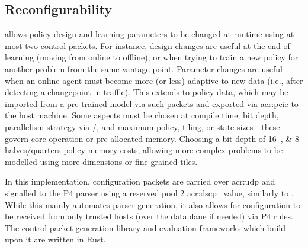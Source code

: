 

\subsection{Reconfigurability}\label{sec:reconfigurability}
\approachshort{} allows policy design and learning parameters to be changed at runtime using at most two control packets.
For instance, design changes are useful at the end of learning (moving from online to offline), or when trying to train a new policy for another problem from the same vantage point.
Parameter changes are useful when an online agent must become more (or less) adaptive to new data (i.e., after detecting a changepoint in traffic).
This extends to policy data, which may be imported from a pre-trained model via such packets and exported via \gls{acr:pcie} to the host machine.
Some aspects must be chosen at compile time; bit depth, parallelism strategy via \Coopfw/\Indfw, and maximum policy, tiling, or state sizes---these govern core operation or pre-allocated memory.
Choosing a bit depth of \qtylist[list-pair-separator = { or }]{16;8}{\bit} halves/quarters policy memory costs, allowing more complex problems to be modelled using more dimensions or fine-grained tiles.

In this implementation, configuration packets are carried over \gls{acr:udp} and signalled to the P4 parser using a reserved pool 2 \gls{acr:dscp}~\parencite{rfc2474} value, similarly to \textcite{DBLP:conf/isca/LiLYCSH19}.
While this mainly automates parser generation, it also allows for configuration to be received from only trusted hosts (over the dataplane if needed) via P4 rules.
The control packet generation library and evaluation frameworks which build upon it are written in Rust.

